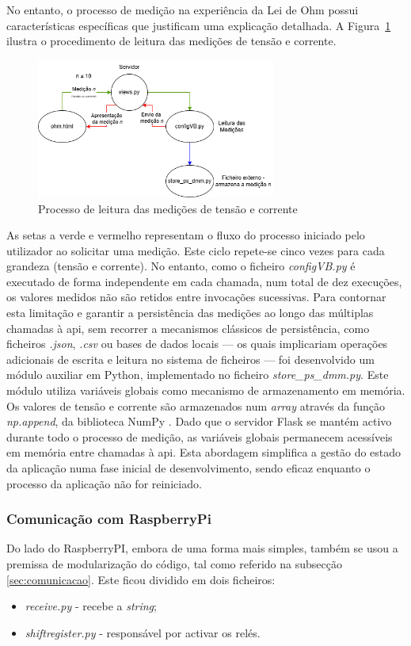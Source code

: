 No entanto, o processo de medição na experiência da Lei de Ohm possui características específicas que justificam uma explicação detalhada. A Figura~\ref{fig:processoleituraUI} ilustra o procedimento de leitura das medições de tensão e corrente.

\begin{figure}[hbtp]
	\centering
	\includegraphics[width=0.7\textwidth]{figures/medicoes_OHM.drawio.png}
	\caption{Processo de leitura das medições de tensão e corrente}
	\label{fig:processoleituraUI}
\end{figure}

As setas a verde e vermelho representam o fluxo do processo iniciado pelo utilizador ao solicitar uma medição. Este ciclo repete-se cinco vezes para cada grandeza (tensão e corrente). No entanto, como o ficheiro \textit{configVB.py} é executado de forma independente em cada chamada, num total de dez execuções, os valores medidos não são retidos entre invocações sucessivas. Para contornar esta limitação e garantir a persistência das medições ao longo das múltiplas chamadas à \acrshort{api}, sem recorrer a mecanismos clássicos de persistência, como ficheiros \textit{.json}, \textit{.csv} ou bases de dados locais — os quais implicariam operações adicionais de escrita e leitura no sistema de ficheiros — foi desenvolvido um módulo auxiliar em Python, implementado no ficheiro \textit{store\_ps\_dmm.py}. Este módulo utiliza variáveis globais como mecanismo de armazenamento em memória. Os valores de tensão e corrente são armazenados num \textit{array} através da função \textit{np.append}, da biblioteca NumPy \cite{NumPy}. Dado que o servidor Flask se mantém activo durante todo o processo de medição, as variáveis globais permanecem acessíveis em memória entre chamadas à \acrshort{api}. Esta abordagem simplifica a gestão do estado da aplicação numa fase inicial de desenvolvimento, sendo eficaz enquanto o processo da aplicação não for reiniciado.

\subsubsection{Comunicação com RaspberryPi}
\label{sec:raspberrypi}
Do lado do \gls{RaspberryPI}, embora de uma forma mais simples, também se usou a premissa de modularização do código, tal como referido na subsecção \ref{sec:comunicacao}. Este ficou dividido em dois ficheiros:
\begin{itemize}
	\item \textit{receive.py} - recebe a \textit{string};
	\item \textit{shift\textunderscore register.py} - responsável por activar os relés.
\end{itemize}

